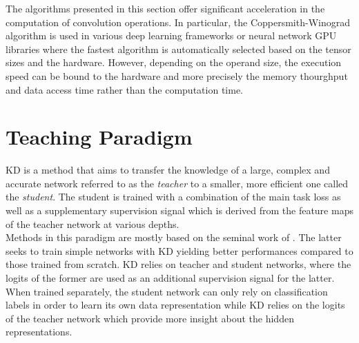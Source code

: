 The algorithms presented in this section offer significant acceleration in the
computation of convolution operations. In particular, the Coppersmith-Winograd
algorithm is used in various deep learning frameworks
\cite{DBLP:journals/corr/AbadiABBCCCDDDG16,DBLP:conf/nips/PaszkeGMLBCKLGA19} or
neural network \ac{GPU} libraries \cite{nvidia_cudnn} where the fastest
algorithm is automatically selected based on the tensor sizes and the hardware.
However, depending on the operand size, the execution speed can be bound to the
hardware and more precisely the memory thourghput and data access time rather
than the computation time.
\cite{DBLP:journals/pc/WhaleyPD01,DBLP:journals/cca/DrevetIS10}


\section{Teaching Paradigm}\label{sec:sota:teaching_paradigm}


\acf{KD} is a method that aims to transfer the knowledge of a large, complex and
accurate network referred to as the \emph{teacher} to a smaller, more efficient
one called the \emph{student}. The student is trained with a combination of the
main task loss as well as a supplementary supervision signal which is derived
from the feature maps of the teacher network at various depths.\\

Methods in this paradigm are mostly based on the seminal work of
\citeauthor{DBLP:journals/corr/HintonVD15} \cite{DBLP:journals/corr/HintonVD15}.
The latter seeks to train simple networks with \acl{KD} yielding better
performances compared to those trained from scratch. \ac{KD} relies on teacher
and student networks, where the logits of the former are used as an additional
supervision signal for the latter. When trained separately, the student network
can only rely on classification labels in order to learn its own data
representation while \ac{KD} relies on the logits of the teacher network which
provide more insight about the hidden representations.\\


